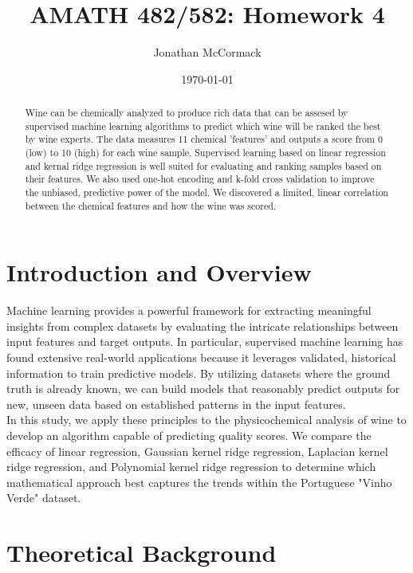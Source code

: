 \documentclass[11pt]{amsart}
\title{AMATH 482/582: Homework 4}
\author{Jonathan McCormack}
\date{\today}
\begin{document}
\begin{abstract}
    Wine can be chemically analyzed to produce rich data that can be assesed by supervised machine 
    learning algorithms to predict which wine will be ranked the best by wine experts. The data 
    measures 11 chemical 'features' and outputs a score from 0 (low) to 10 (high) for each wine 
    sample. Supervised learning based on linear regression and kernal ridge regression is well suited 
    for evaluating and ranking samples based on their features. We also used one-hot encoding and 
    k-fold cross validation to improve the unbiased, predictive power of the model. We discovered a 
    limited, linear correlation between the chemical features and how the wine was scored.

\end{abstract}

\maketitle 

\section{Introduction and Overview}\label{sec:Introduction}

Machine learning provides a powerful framework for extracting meaningful insights from complex datasets 
by evaluating the intricate relationships between input features and target outputs. In particular, 
supervised machine learning has found extensive real-world applications because it leverages validated, 
historical information to train predictive models. By utilizing datasets where the ground truth is already 
known, we can build models that reasonably predict outputs for new, unseen data based on established patterns 
in the input features. \\

In this study, we apply these principles to the physicochemical analysis of wine to develop an algorithm 
capable of predicting quality scores. We compare the efficacy of linear regression, Gaussian kernel ridge regression, 
Laplacian kernel ridge regression, and Polynomial kernel ridge regression to determine which mathematical 
approach best captures the trends within the Portuguese "Vinho Verde" dataset.

\section{Theoretical Background}\label{sec:Theory}
\end{document}
